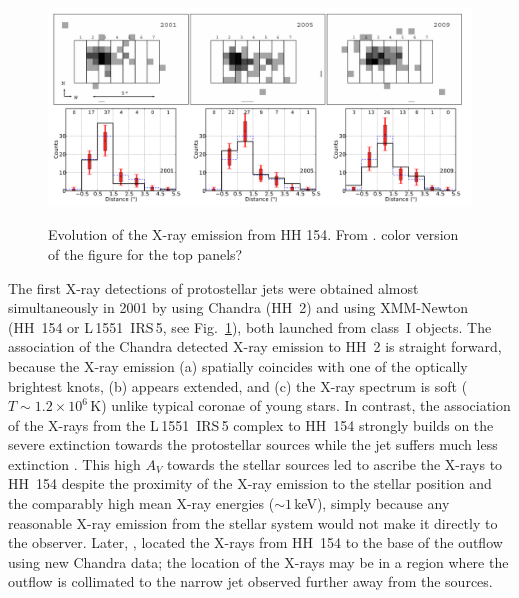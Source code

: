 \begin{figure}[t]
\centering

\includegraphics[height=6cm]{figs/hh154}
\caption{Evolution of the X-ray emission from HH 154. From \citet{Schneider_2011}. \label{fig:hh154} {\color{red} color version of the figure for the top panels?}}
\end{figure}


The first X-ray detections of protostellar jets were obtained almost simultaneously in 2001 by \citet{Pravdo_2001} using Chandra (HH~2) and \citet{Favata_2002}
using XMM-Newton (HH~154 or L\,1551~IRS\,5, see Fig.~\ref{fig:hh154}), both launched from class~I objects. The association of the Chandra detected X-ray emission to HH~2 is straight forward, because the X-ray emission  (a) spatially coincides with one of the optically brightest knots, (b) appears extended, and (c) the X-ray spectrum is soft ($T\sim1.2\times10^6\,$K) unlike typical coronae of young stars. In contrast, the association of the X-rays from the L\,1551~IRS\,5 complex to HH~154 strongly builds on the severe extinction towards the protostellar sources while the jet suffers much less extinction \citep[$A_V(jet)\sim10\,$mag vs $A_V(protostars)\gtrsim150$\,mag, e.g.,][]{White_2000,Fridlund_2005}. This high $A_V$ towards the stellar sources led \citet{Favata_2002} to ascribe the X-rays to HH~154 despite the proximity of the X-ray emission to the stellar position and the comparably high mean X-ray energies ($\sim1\,$keV), simply because any reasonable X-ray emission from the stellar system would not make it directly to the observer. Later, \citet{Bally_2003}, located the X-rays from HH~154 to the base of the outflow using new Chandra data; the location of the X-rays may be in a region where the outflow is collimated to the narrow jet observed further away from the sources. 

